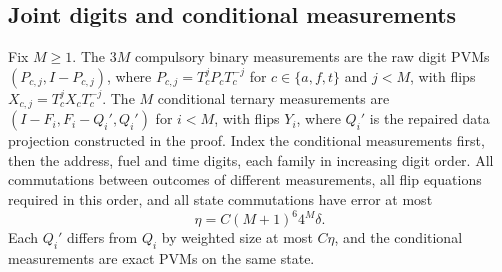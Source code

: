 \subsection{Joint digits and conditional measurements}
\begin{lemma}\label{lem:joint}
Fix $M\ge1$. The $3M$ compulsory binary measurements are the raw digit PVMs $(P_{c,j},I-P_{c,j})$, where $P_{c,j}=T_c^jP_cT_c^{-j}$ for $c\in\{a,f,t\}$ and $j<M$, with flips $X_{c,j}=T_c^jX_cT_c^{-j}$. The $M$ conditional ternary measurements are $(I-F_i,F_i-Q_i',Q_i')$ for $i<M$, with flips $Y_i$, where $Q_i'$ is the repaired data projection constructed in the proof. Index the conditional measurements first, then the address, fuel and time digits, each family in increasing digit order. All commutations between outcomes of different measurements, all flip equations required in this order, and all state commutations have error at most
\begin{equation}\label{eq:eta}
 \eta=C(M+1)^6 4^M\delta.
\end{equation}
Each $Q_i'$ differs from $Q_i$ by weighted size at most $C\eta$, and the conditional measurements are exact PVMs on the same state.
\end{lemma}
